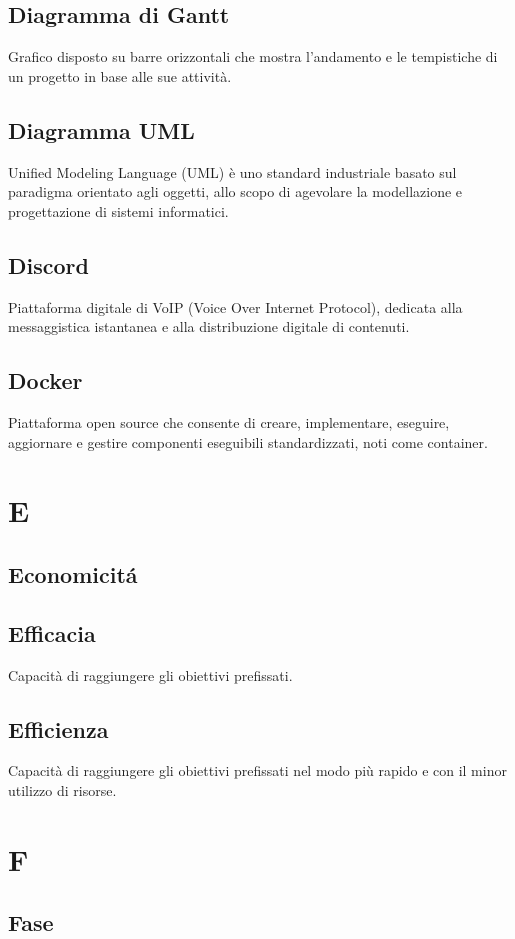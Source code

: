 \documentclass[12pt]{article}
\begin{document}
		\subsection{Diagramma di Gantt}
		Grafico disposto su barre orizzontali che mostra l'andamento e le tempistiche di un progetto in base alle sue attività.
		\subsection{Diagramma UML}
		Unified Modeling Language (UML) è uno standard industriale basato sul paradigma orientato agli oggetti, allo scopo di agevolare la modellazione e progettazione di sistemi informatici.
		\subsection{Discord}
		Piattaforma digitale di VoIP (Voice Over Internet Protocol), dedicata alla messaggistica istantanea e alla distribuzione digitale di contenuti.
		\subsection{Docker}
		Piattaforma open source che consente di creare, implementare, eseguire, aggiornare e gestire componenti eseguibili standardizzati, noti come container.

	\clearpage
	\section{E}
		\subsection{Economicit\'a}
		\subsection{Efficacia}
		Capacità di raggiungere gli obiettivi prefissati.
		\subsection{Efficienza}
		Capacità di raggiungere gli obiettivi prefissati nel modo più rapido e con il minor utilizzo di risorse.
	\clearpage
	\section{F}
		\subsection{Fase}
\end{document}
